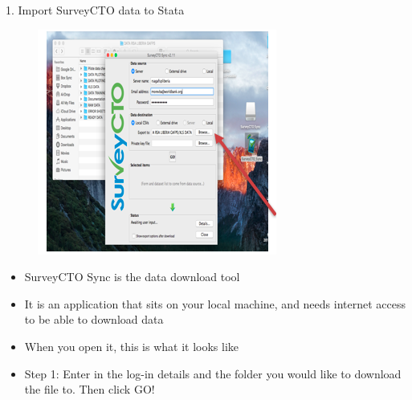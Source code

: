 \documentclass[aspectratio=169]{beamer}
\begin{document}
\begin{frame}[fragile]{1. Import SurveyCTO data to Stata}
\begin{multicols}{2}	
\begin{figure}
	\centering
	\includegraphics[width=\linewidth]{img/scto1}
\end{figure}
\begin{itemize}
	\item SurveyCTO Sync is the data download tool
	\item It is an application that sits on your local machine, and needs internet access to be able to download data	
	\item When you open it, this is what it looks like
	\item Step 1: Enter in the log-in details and the folder you would like to download the file to. Then click GO! 
\end{itemize}
\end{multicols}
\end{frame}
\end{document}
